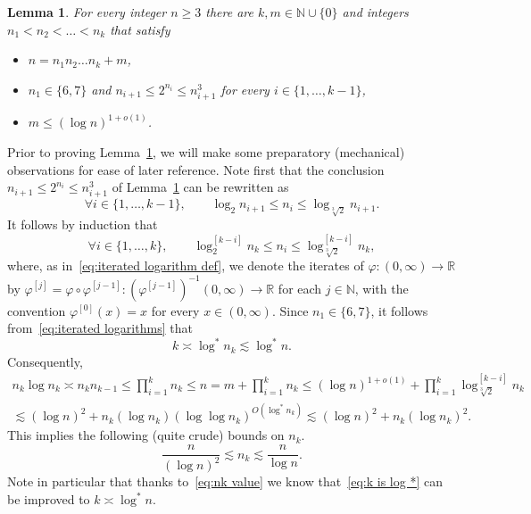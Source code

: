 \documentclass[11pt,reqno]{amsart}
\renewcommand{\le}{\leqslant}
\renewcommand{\ge}{\geqslant}
\newcommand{\f}{\varphi}
\newcommand{\R}{\mathbb R}
\newtheorem{lemma}[theorem]{Lemma}
\theoremstyle{remark}
\newcommand{\N}{\mathbb N}
\renewcommand{\1}{\mathbf 1}
\begin{document}
\begin{lemma}\label{lem log* approx} For every integer $n\ge 3$ there are $k,m\in \N\cup\{0\}$ and integers $n_1<n_2<\ldots <n_k$ that satisfy
\begin{itemize}
\item $n=n_1n_2\ldots n_k +m$,
\item $n_1\in \{6,7\}$ and $n_{i+1}\le 2^{n_i}\le n_{i+1}^3$ for every $i\in \{1,\ldots,k-1\}$,
\item $m\le (\log n)^{1+o(1)}$.
\end{itemize}
\end{lemma}
Prior to proving Lemma~\ref{lem log* approx}, we will make some preparatory (mechanical) observations for ease of later reference. Note first that the conclusion $n_{i+1}\le 2^{n_i}\le n_{i+1}^3$ of Lemma~\ref{lem log* approx} can be rewritten as
$$
\forall i\in \{1,\ldots, k-1\},\qquad \log_2 n_{i+1}\le n_i \le \log_{\sqrt[3]{2}} n_{i+1}.
$$
It follows by induction that
\begin{equation}\label{eq:iterated logarithms}
\forall i\in \{1,\ldots, k\},\qquad  \log_{2}^{[k-i]}n_k\le n_i\le \log_{\sqrt[3]{2}}^{[k-i]}n_k,
\end{equation}
where, as in~\eqref{eq:iterated logarithm def}, we denote the iterates of $\f:(0,\infty)\to \R$  by  $\f^{[j]}=\f\circ \f^{[j-1]}: (\f^{[j-1]})^{-1}(0,\infty)\to \R$ for each $j\in \N$, with the convention $\f^{[0]}(x)=x$ for every $x\in (0,\infty)$. Since $n_1\in \{6,7\}$, it follows from~\eqref{eq:iterated logarithms} that
\begin{equation}\label{eq:k is log *}
k\asymp \log^{*}\!\!n_k\lesssim \log^{*}\!\!n.
\end{equation}
Consequently,
\begin{multline*}
n_k\log n_k\asymp n_kn_{k-1}\le \prod_{i=1}^k n_k\le  n=m+\prod_{i=1}^k n_k\le (\log n)^{1+o(1)}+\prod_{i=1}^k \log_{\sqrt[3]{2}}^{[k-i]}n_k \\ \lesssim   (\log n)^2+ n_k(\log n_k) (\log\log n_k)^{O(\log^{*}\!\!n_k)}\lesssim  (\log n)^2+n_k (\log n_k)^2.
\end{multline*}
This implies the following (quite crude) bounds on $n_k$.
\begin{equation}\label{eq:nk value}
\frac{n}{(\log n)^2}\lesssim n_k\lesssim \frac{n}{\log n}.
\end{equation}
Note in particular that thanks to~\eqref{eq:nk value} we know that~\eqref{eq:k is log *} can be improved to $k\asymp \log^{*}\!\!n$.
\end{document}
